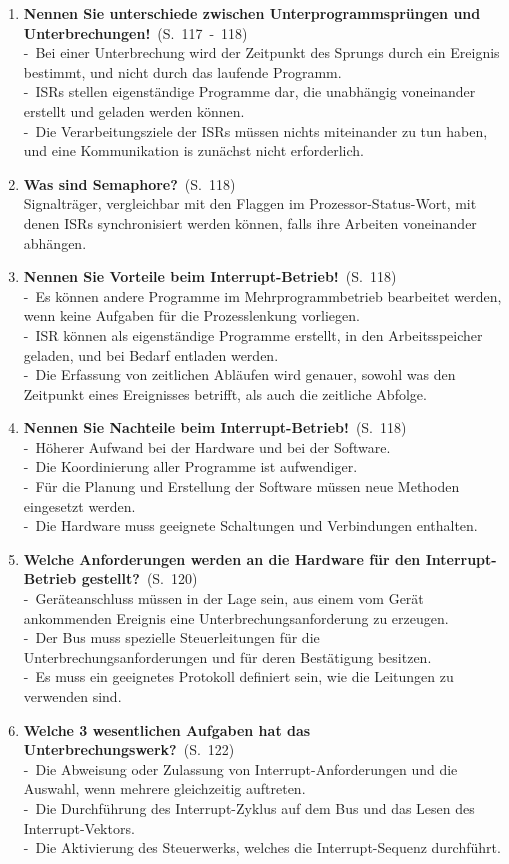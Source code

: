 \documentclass[a4paper,12pt]{article}
\newcommand{\question}[3]{\pagebreak[3]\item {\textbf{#1?}}\ (S.\ #2)#3}
\newcommand{\statement}[3]{\pagebreak[3]\item {\textbf{#1!}}\ (S.\ #2)#3}
\newcommand{\catchword}[1]{\\-\ #1}
\newcommand{\normaltext}[1]{\\#1}
\newcommand{\page}[1]{#1}
\newcommand{\pages}[2]{#1\ -\ #2}
\begin{document}
\begin{enumerate}
  \statement{Nennen Sie unterschiede zwischen Unterprogrammsprüngen und Unterbrechungen}{\pages{117}{118}}
  {
    \catchword{Bei einer Unterbrechung wird der Zeitpunkt des Sprungs durch ein Ereignis bestimmt, und 
    nicht durch das laufende Programm.}
    \catchword{ISRs stellen eigenständige Programme dar, die unabhängig voneinander erstellt und geladen
    werden können.}
    \catchword{Die Verarbeitungsziele der ISRs müssen nichts miteinander zu tun haben, und eine Kommunikation
    is zunächst nicht erforderlich.}
  }

  \question{Was sind Semaphore}{\page{118}}
  {
    \normaltext{Signalträger, vergleichbar mit den Flaggen im Prozessor-Status-Wort, mit denen ISRs 
                synchronisiert werden können, falls ihre Arbeiten voneinander abhängen.}
  }

  \statement{Nennen Sie Vorteile beim Interrupt-Betrieb}{\page{118}}
  {
    \catchword{Es können andere Programme im Mehrprogrammbetrieb bearbeitet werden, wenn keine Aufgaben für die 
    Prozesslenkung vorliegen.}
    \catchword{ISR können als eigenständige Programme erstellt, in den Arbeitsspeicher geladen, und bei Bedarf 
    entladen werden.}
    \catchword{Die Erfassung von zeitlichen Abläufen wird genauer, sowohl was den Zeitpunkt eines Ereignisses
    betrifft, als auch die zeitliche Abfolge.}
  }

  \statement{Nennen Sie Nachteile beim Interrupt-Betrieb}{\page{118}}
  {
    \catchword{Höherer Aufwand bei der Hardware und bei der Software.}
    \catchword{Die Koordinierung aller Programme ist aufwendiger.}
    \catchword{Für die Planung und Erstellung der Software müssen neue Methoden eingesetzt werden.}
    \catchword{Die Hardware muss geeignete Schaltungen und Verbindungen enthalten.}
  }

  \question{Welche Anforderungen werden an die Hardware für den Interrupt-Betrieb gestellt}{\page{120}}
  {
    \catchword{Geräteanschluss müssen in der Lage sein, aus einem vom Gerät ankommenden Ereignis eine 
    Unterbrechungsanforderung zu erzeugen.}
    \catchword{Der Bus muss spezielle Steuerleitungen für die Unterbrechungsanforderungen und für deren
    Bestätigung besitzen.}
    \catchword{Es muss ein geeignetes Protokoll definiert sein, wie die Leitungen zu verwenden sind.}
  }

  \question{Welche 3 wesentlichen Aufgaben hat das Unterbrechungswerk}{\page{122}}
  {
    \catchword{Die Abweisung oder Zulassung von Interrupt-Anforderungen und die Auswahl, wenn mehrere
    gleichzeitig auftreten.}
    \catchword{Die Durchführung des Interrupt-Zyklus auf dem Bus und das Lesen des Interrupt-Vektors.}
    \catchword{Die Aktivierung des Steuerwerks, welches die Interrupt-Sequenz durchführt.}
  }


\end{enumerate}
\end{document}
